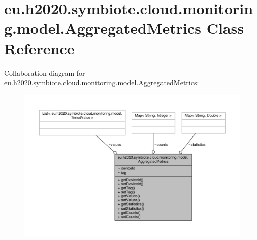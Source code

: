 \hypertarget{classeu_1_1h2020_1_1symbiote_1_1cloud_1_1monitoring_1_1model_1_1AggregatedMetrics}{}\section{eu.\+h2020.\+symbiote.\+cloud.\+monitoring.\+model.\+Aggregated\+Metrics Class Reference}
\label{classeu_1_1h2020_1_1symbiote_1_1cloud_1_1monitoring_1_1model_1_1AggregatedMetrics}


Collaboration diagram for eu.\+h2020.\+symbiote.\+cloud.\+monitoring.\+model.\+Aggregated\+Metrics\+:\nopagebreak
\begin{figure}[H]
\begin{center}
\leavevmode
\includegraphics[width=350pt]{classeu_1_1h2020_1_1symbiote_1_1cloud_1_1monitoring_1_1model_1_1AggregatedMetrics__coll__graph}
\end{center}
\end{figure}
